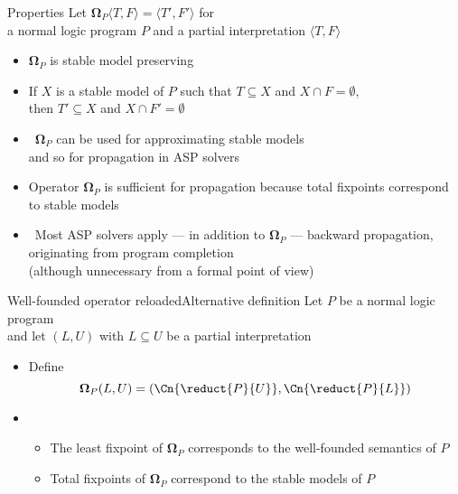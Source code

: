 \begin{frame}{Properties}
  Let ${\mathbf{\Omega}}_P\langle T,F \rangle=\langle T',F'\rangle$
  for\\
  a normal logic program $P$ and
  a partial interpretation $\langle T,F \rangle$
  \smallskip
  \begin{itemize}
  \item<2-> ${\mathbf{\Omega}}_P$ is \alert{stable model preserving}
  \item<2-> [] If $X$ is a stable model of $P$ such that $T\subseteq X$ and $X\cap F=\emptyset$,
    \\ then $T'\subseteq X$ and $X\cap F'=\emptyset$
    \smallskip
  \item<3->  \ ${\mathbf{\Omega}}_P$ can be used for approximating stable models
    \\ and so for propagation in ASP solvers
    \smallskip
  \item <4-> [] %
    Operator ${\mathbf{\Omega}}_P$ is sufficient for propagation
    because total fixpoints correspond to stable models
    \medskip
  \item<5->  \
    Most ASP solvers apply --- in addition to ${\mathbf{\Omega}}_P$ --- \alert{backward propagation},
    originating from program completion
    \\
    (although unnecessary from a formal point of view)
  \end{itemize}
\end{frame}
\begin{frame}{Well-founded operator reloaded}{Alternative definition}
  Let $P$ be a normal logic program\\
  and let $(L,U)$ with $L\subseteq U$ be a partial interpretation
  \bigskip
  \begin{itemize}
  \item <2-> Define
    \[
      {\mathbf{\Omega}}_P(L,U)
      =
      (\Cn{\reduct{P}{U}},\Cn{\reduct{P}{L}})
    \]
  \item <3-> 
    \begin{itemize}\normalsize
    \item The least fixpoint  of ${\mathbf{\Omega}}_P$ corresponds to the well-founded semantics of $P$
      \smallskip
    \item Total fixpoints of ${\mathbf{\Omega}}_P$ correspond  to the stable models of $P$
    \end{itemize}
  \end{itemize}
  \nocite{truszczynski18a}
\end{frame}
%

